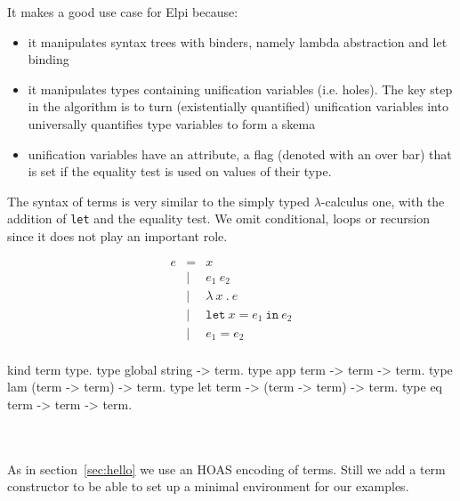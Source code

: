 \documentclass[a4paper, 11pt]{book}
\begin{document}
It makes a good use case for Elpi because:
\begin{itemize}
  \item it manipulates syntax trees with binders, namely lambda abstraction
    and let binding
  \item it manipulates types containing unification variables (i.e. holes).
    The key step in the algorithm is to turn (existentially quantified)
    unification variables into universally quantifies type variables to
    form a skema
  \item unification variables have an attribute, a flag (denoted with
    an over bar) that is set if the equality test is used on values
    of their type.
\end{itemize}

The syntax of terms is very similar to the simply typed $\lambda$-calculus
one, with the addition of \texttt{let} and the equality test. We omit
conditional, loops or recursion since it does not play an important role.

\begin{center}
\begin{minipage}{0.35\textwidth}
$$
\begin{array}{lrl}
  e & =     & x                                 \\
  & \vert & e_1\ e_2                            \\
  & \vert & \lambda\ x\ .\ e                    \\
  & \vert & \mathtt{let}\ x = e_1\ \mathtt{in}\ e_2 \\
  & \vert & e_1 = e_2 \\
\end{array}
$$
\end{minipage}
\begin{minipage}{0.60\textwidth}
\vspace{0.5em}
\begin{elpicodelj}
kind term   type.
type global string -> term.
type app    term -> term -> term.
type lam    (term -> term) -> term.
type let    term -> (term -> term) -> term.
type eq     term -> term -> term.
\end{elpicodelj}
\end{minipage}
\end{center}
~\\  
~\\  
As in section~\ref{sec:hello} we use an HOAS encoding of terms.
Still we add a  term constructor to
be able to set up a minimal environment for our examples.
\end{document}
